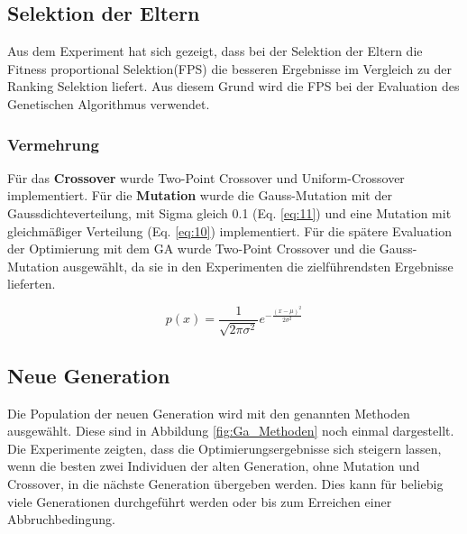 \subsection{Selektion der Eltern} \label{implementierung_Selektion_Eltern}
Aus dem Experiment hat sich gezeigt, dass bei der Selektion der Eltern die Fitness proportional Selektion(FPS) die besseren Ergebnisse im Vergleich zu der Ranking Selektion liefert. Aus diesem Grund wird die FPS bei der Evaluation des Genetischen Algorithmus verwendet.

\subsubsection{Vermehrung} \label{implementierung_vermehrung}
Für das \textbf{Crossover} wurde Two-Point Crossover und Uniform-Crossover implementiert. Für die \textbf{Mutation} wurde die Gauss-Mutation mit der Gaussdichteverteilung, mit Sigma gleich 0.1 (Eq. \ref{eq:11}) und eine Mutation mit gleichmäßiger Verteilung (Eq. \ref{eq:10}) implementiert. Für die spätere Evaluation der Optimierung mit dem GA wurde Two-Point Crossover und die Gauss-Mutation ausgewählt, da sie in den Experimenten die zielführendsten Ergebnisse lieferten.

\begin{equation}
	p(x) = \frac{1}{\sqrt{ 2 \pi \sigma^2 }} e^{ - \frac{ (x - \mu)^2 } {2 \sigma^2} } \label{eq:11}
\end{equation} 

\newpage

\subsection{Neue Generation}
Die Population der neuen Generation wird mit den genannten Methoden ausgewählt. Diese sind in Abbildung \ref{fig:Ga_Methoden} noch einmal dargestellt. Die Experimente zeigten, dass die Optimierungsergebnisse sich steigern lassen, wenn die besten zwei Individuen der alten Generation, ohne Mutation und Crossover, in die nächste Generation übergeben werden. Dies kann für beliebig viele Generationen durchgeführt werden oder bis zum Erreichen einer Abbruchbedingung.

